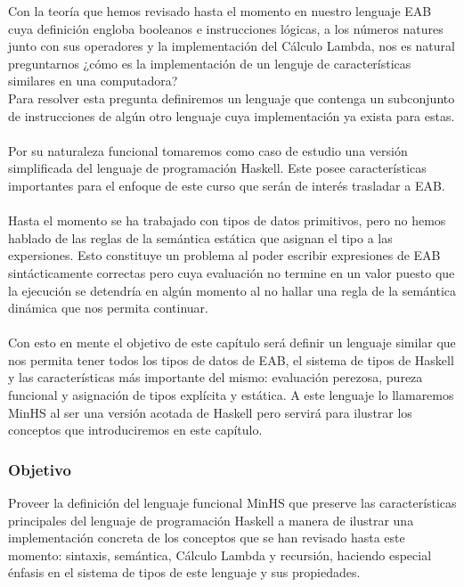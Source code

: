 Con la teoría que hemos revisado hasta el momento en nuestro lenguaje \textsf{EAB} cuya definición engloba booleanos e instrucciones lógicas, a los números natures junto con sus operadores y la implementación del Cálculo Lambda, nos es natural preguntarnos  ¿cómo es la implementación de un lenguje de características similares en una computadora? \\ Para resolver esta pregunta definiremos un lenguaje que contenga un subconjunto de instrucciones de algún otro lenguaje cuya implementación ya exista para estas.  \\\\
Por su naturaleza funcional tomaremos como caso de estudio una versión simplificada del lenguaje de programación \textsf{Haskell}. Este posee características importantes para el enfoque de este curso que serán de interés trasladar a \textsf{EAB}. \\\\
Hasta el momento se ha trabajado con tipos de datos primitivos, pero no hemos hablado de las reglas de la semántica estática que asignan el tipo a las expersiones. Esto constituye un problema al poder escribir expresiones de \textsf{EAB} sintácticamente correctas pero cuya evaluación no termine en un valor puesto que la ejecución se detendría en algún momento al no hallar una regla de la semántica dinámica que nos permita continuar. \\\\
Con esto en mente el objetivo de este capítulo será definir un lenguaje similar que nos permita tener todos los tipos de datos de \textsf{EAB}, el sistema de tipos de \textsf{Haskell} y las características más importante del mismo: evaluación perezosa, pureza funcional y asignación de tipos explícita y estática. 
A este lenguaje lo llamaremos \textsf{MinHS} al ser una versión acotada de \textsf{Haskell} pero servirá para ilustrar los conceptos que introduciremos en este capítulo.

\subsubsection{Objetivo}
Proveer la definición del lenguaje funcional \textsf{MinHS} que preserve las características principales del lenguaje de programación \textsf{Haskell} a manera de ilustrar una implementación concreta de los conceptos que se han revisado hasta este momento: sintaxis, semántica, Cálculo Lambda y recursión, haciendo especial énfasis en el sistema de tipos de este lenguaje y sus propiedades.


